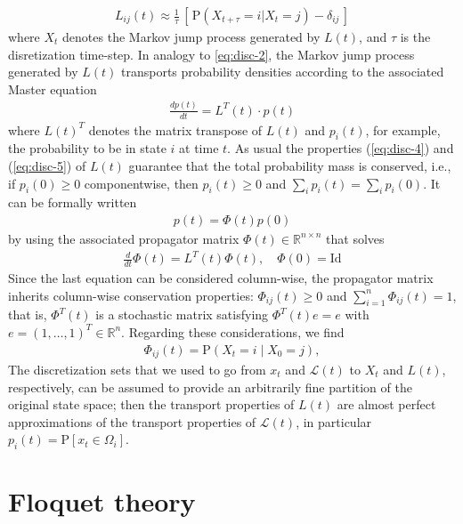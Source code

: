 \documentclass[aps, pre, preprint,unsortedaddress,a4paper,onecolumn]{revtex4}
\newcommand{\vect}[1]{#1}
\newcommand{\ml}[0]{\mathcal {L}}
\newcommand{\id}{\mathrm{Id}}
\newcommand{\myphi}{\Phi}
\newcommand{\prob}{\textrm{P}}
\begin{document}
\begin{align}
  \label{eqn:tmp4}
  L_{ij}(t) \approx \frac{1}{\tau}
  \,[\, \prob (\vect X_{t+\tau} = i \vert \vect X_{t} = j) - \delta_{ij} \,]
\end{align}
where $\vect X_t$ denotes the Markov jump process generated by $\vect L(t)$, 
and $\tau$ is the disretization time-step.
In analogy to \eqref{eq:disc-2}, the Markov jump process generated by
$\vect L(t)$ transports probability densities according to the associated Master equation
\begin{align}
  \label{eq:disc-7}
  \frac{d\vect p(t)}{dt} = \vect L^T(t)\cdot \vect p(t)
\end{align}
where $\vect L(t)^T$ denotes the matrix transpose of $\vect L(t)$ and
$p_i(t)$, for example, the probability to be in state $i$ at time $t$.
As usual the properties (\ref{eq:disc-4}) and (\ref{eq:disc-5}) of
$\vect L(t)$ guarantee that the total probability mass is conserved,
i.e., if $p_i(0)\ge 0$ componentwise, then $p_i(t)\ge 0$ and $\sum_i
p_i(t) = \sum_ip_i(0)$.
It can be formally written
\begin{align}  \label{eq:disc-8}
\vect p(t)=\myphi(t)\vect p(0)
\end{align}
by using the
associated propagator matrix $\myphi(t)\in\mathbb R^{n\times n}$ that solves
\begin{align}
  \label{eq:disc-9}
  \frac{d}{dt}\myphi(t) = \vect L^T(t)\myphi(t), \quad \myphi(0) = \id
\end{align}
Since the last equation can be considered column-wise, the propagator matrix inherits column-wise conservation properties:
$\Phi_{ij}(t) \ge  0$
and $\sum\limits_{i=1}^n \Phi_{ij}(t)  =  1$,
that is, $\myphi^T(t)$ is a
stochastic matrix satisfying $\myphi^T(t)\vect e=\vect e$
with $\vect e=(1,\ldots,1)^T\in \mathbb R^n$.
Regarding these considerations, we find
\begin{align}
\label{eq:disc-10}  
\myphi_{ij}(t)=\prob\left(\vect X_t=i\mid \vect X_0=j \right),
\end{align}
 The
discretization sets that we used to go from $\vect x_t$ and $\ml(t)$ to $\vect X_t$
and $\vect L(t)$, respectively, can be assumed to provide an arbitrarily fine
partition of the original state space; then the transport properties
of $\vect L(t)$ are almost perfect approximations of the transport properties
of $\ml(t)$, in particular $p_i(t)=\prob[x_t\in \Omega_i]$.


\section{Floquet theory}
\label{sec:floquet}
\end{document}
